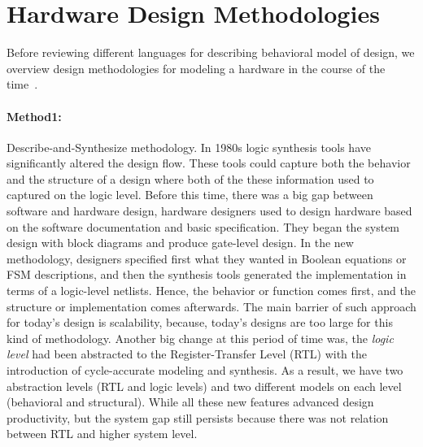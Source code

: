 \section{Hardware Design Methodologies}

Before reviewing different languages for describing behavioral model of design, we overview design methodologies for modeling a hardware in the course of the time~\cite{michel_2012_synthesis}.

\paragraph{Method1:} Describe-and-Synthesize methodology.
In 1980s logic synthesis tools have significantly altered the design flow.
These tools could capture both the behavior and the structure of a design where both of the these information used to captured on the logic level. Before this time, there was a big gap between software and hardware design, hardware designers used to design hardware based on the software documentation and basic specification. They began the system design with block diagrams and produce gate-level design.
In the new methodology, designers specified first what they wanted in Boolean equations or FSM descriptions, and then the synthesis tools generated the implementation in terms of a logic-level netlists.
Hence, the behavior or function comes first, and the structure or implementation comes afterwards.
The main barrier of such approach for today's design is scalability, because, today’s designs are too large for this kind of methodology.
Another big change at this period of time was, the \textit{logic level} had been abstracted to the Register-Transfer Level (RTL) with the introduction of cycle-accurate modeling and synthesis.
As a result, we have two abstraction levels (RTL and logic levels) and two different models on each level (behavioral and structural).
While all these new features advanced design productivity, but the system gap still persists because there was not relation between RTL and higher system level.

